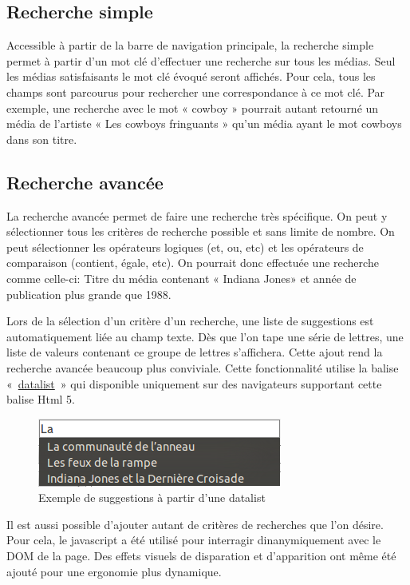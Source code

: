 \documentclass[letter, 11pt]{report}
\begin{document}
\subsection{Recherche simple}
Accessible à partir de la barre de navigation principale, la recherche simple permet à partir d'un mot clé d'effectuer une recherche sur tous les médias. Seul les médias satisfaisants le mot clé évoqué seront affichés. Pour cela, tous les champs sont parcourus pour rechercher une correspondance à ce mot clé. Par exemple, une recherche avec le mot « cowboy » pourrait autant retourné un média de l'artiste « Les cowboys fringuants » qu'un média ayant le mot cowboys dans son titre. 

\subsection{Recherche avancée}
\label{sec:recherche-avancée}
La recherche avancée permet de faire une recherche très spécifique. On peut y sélectionner tous les critères de recherche possible et sans limite de nombre. On peut sélectionner les opérateurs logiques (et, ou, etc) et les opérateurs de comparaison (contient, égale, etc). On pourrait donc effectuée une recherche comme celle-ci: Titre du média contenant « Indiana Jones» et année de publication plus grande que 1988.

Lors de la sélection d'un critère d'un recherche, une liste de suggestions est automatiquement liée au champ texte. Dès que l'on tape une série de lettres, une liste de valeurs contenant ce groupe de lettres s'affichera.  Cette ajout rend la recherche avancée beaucoup plus conviviale. Cette fonctionnalité utilise la balise «~\href{http://www.w3schools.com/html5/tag_datalist.asp}{datalist}~» qui disponible uniquement sur des navigateurs supportant cette balise Html 5.

\begin{figure}[htbp]
	\begin{center}
		\includegraphics[scale=0.5]{exempleDatalist.png}
	\end{center}
	\caption{Exemple de suggestions à partir d'une datalist}
\end{figure}

Il est aussi possible d'ajouter autant de critères de recherches que l'on désire. Pour cela, le javascript a été utilisé pour interragir dinanymiquement avec le DOM de la page. Des effets visuels de disparation et d'apparition ont même été ajouté pour une ergonomie plus dynamique.
\end{document}
